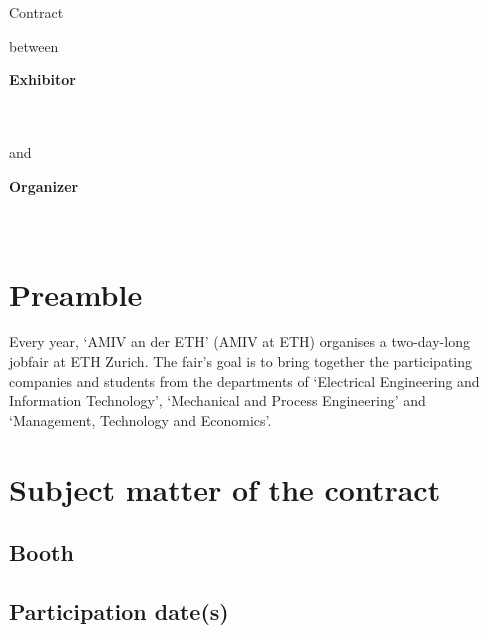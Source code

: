 \renewcommand*{\thesection}{\S\ \arabic{section}}

\begin{center}
\amivfairtitle
\bigbreak
\begin{huge}
Contract
\end{huge}
\medbreak
between
\bigbreak
\end{center}

\vspace{2cm}

\begin{minipage}[t]{0.4\textwidth}
\textbf{Exhibitor}
\bigbreak
\companyname\\
\companyaddress\\
\companycity\\
\companycountry
\end{minipage}%
\begin{minipage}[t]{0.2\textwidth}
and
\end{minipage}%
\begin{minipage}[t]{0.4\textwidth}
\textbf{Organizer}
\bigbreak
\amivname\\
\amivaddress\\
\amivpostal\ \amivcity
\end{minipage}

\vfill
\section*{Preamble}

Every year, `AMIV an der ETH' (AMIV at ETH) organises a two-day-long jobfair at ETH
Zurich. The fair's goal is to bring together the participating companies and students
from the departments of `Electrical Engineering and Information Technology',
`Mechanical and Process Engineering' and `Management, Technology and Economics'.

\newpage
\section{Subject matter of the contract}
\subsection{Booth}

\companyboothchoice\hfill\companyboothprice
\companyboothinfo

\subsection{Participation date(s)}

